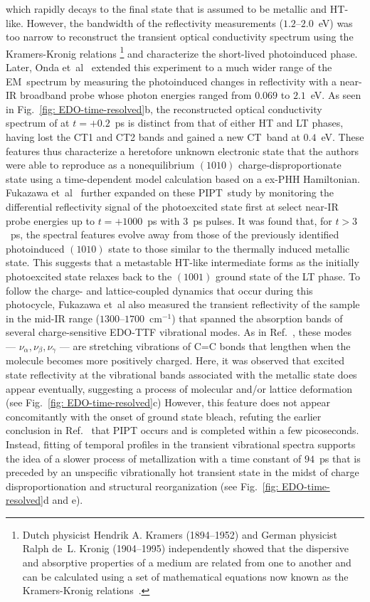 which rapidly decays to the final state that is assumed to be metallic and HT-like.
%
However, the bandwidth of the reflectivity measurements ($1.2$--$2.0$~eV) was too narrow
to reconstruct the transient optical conductivity spectrum using the Kramers-Kronig relations%
\footnote{Dutch physicist Hendrik A. Kramers (1894--1952) and German physicist Ralph de~L. Kronig (1904--1995)
independently showed that the dispersive and absorptive properties of a medium are related from one to another and
can be calculated using a set of mathematical equations now known as
the Kramers-Kronig relations~\cite{Kronig1926, Kramers1927, KramersBook}.}
and characterize the short-lived photoinduced phase.
%
Later, Onda et~al~\cite{Onda2008} extended this experiment to a much wider range of the EM~spectrum
by measuring the photoinduced changes in reflectivity with a near-IR broadband probe
whose photon energies ranged from $0.069$ to $2.1$~eV.
As seen in Fig.~\ref{fig: EDO-time-resolved}b,
the reconstructed optical conductivity spectrum of at $t = +0.2$~ps is distinct from
that of either HT and LT phases, having lost the CT1 and CT2 bands and gained a new CT~band at $0.4$~eV.
These features thus characterize a heretofore unknown electronic state that
the authors were able to reproduce as a nonequilibrium $(1010)$ charge-disproportionate state
using a time-dependent model calculation based on a ex-PHH Hamiltonian.
%
Fukazawa et~al~\cite{Fukazawa2012} further expanded on these PIPT~study
by monitoring the differential reflectivity signal of the photoexcited state
first at select near-IR probe energies up to $t = +1000$~ps with $3$~ps pulses.
%
It was found that, for $t > 3$~ps, the spectral features evolve away from
those of the previously identified photoinduced $(1010)$ state to
those similar to the thermally induced metallic state.
%
This suggests that a metastable HT-like intermediate forms as the initially photoexcited state
relaxes back to the $(1001)$ ground state of the LT phase.
%
To follow the charge- and lattice-coupled dynamics that occur during this photocycle,
Fukazawa et~al also measured the transient reflectivity of the sample in the mid-IR range ($1300$--$1700$~cm$^{-1}$)
that spanned the absorption bands of several charge-sensitive EDO-TTF vibrational modes.
%
As in Ref.~\cite{Drozdova2004}, these modes --- $\nu_\alpha, \nu_\beta, \nu_\gamma$ ---
are stretching vibrations of C=C bonds that lengthen when the molecule becomes more positively charged.
%
Here, it was observed that excited state reflectivity at the vibrational bands
associated with the metallic state does appear eventually,
suggesting a process of molecular and/or lattice deformation (see Fig.~\ref{fig: EDO-time-resolved}c)
%
However, this feature does not appear concomitantly with the onset of ground state bleach,
refuting the earlier conclusion in Ref.~\cite{Chollet2004} that
PIPT occurs and is completed within a few picoseconds.
%
Instead, fitting of temporal profiles in the transient vibrational spectra
supports the idea of a slower process of metallization with a time constant of $94$~ps that is preceded by
an unspecific vibrationally hot transient state in the midst of charge disproportionation and
structural reorganization (see Fig.~\ref{fig: EDO-time-resolved}d and e).

